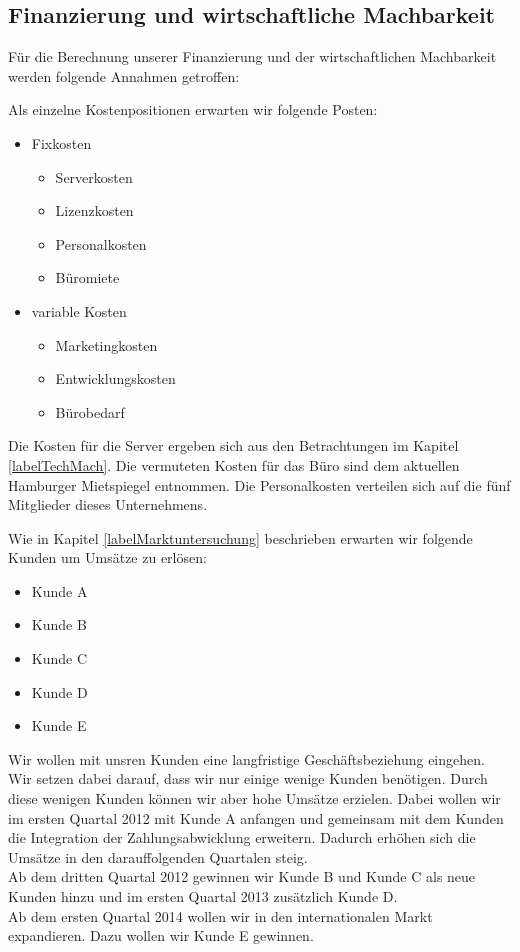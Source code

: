 \newpage
\subsection{Finanzierung und wirtschaftliche Machbarkeit}\label{labelWirtMach}

Für die Berechnung unserer Finanzierung und der wirtschaftlichen Machbarkeit werden folgende Annahmen getroffen:

Als einzelne Kostenpositionen erwarten wir folgende Posten:
\begin{itemize}
\item Fixkosten
 \begin{itemize}
\item Serverkosten
\item Lizenzkosten
\item Personalkosten
\item Büromiete
 \end{itemize}
\item variable Kosten
\begin{itemize}
\item Marketingkosten
\item Entwicklungskosten
\item Bürobedarf
\end{itemize}
\end{itemize}

Die Kosten für die Server ergeben sich aus den Betrachtungen im Kapitel \ref{labelTechMach}. Die vermuteten Kosten für das Büro sind dem aktuellen Hamburger Mietspiegel entnommen. Die Personalkosten verteilen sich auf die fünf Mitglieder dieses Unternehmens.

Wie in Kapitel \ref{labelMarktuntersuchung} beschrieben erwarten wir folgende Kunden um Umsätze zu erlösen:
\begin{itemize}
\item Kunde A
\item Kunde B
\item Kunde C
\item Kunde D
\item Kunde E
\end{itemize}

Wir wollen mit unsren Kunden eine langfristige Geschäftsbeziehung eingehen. Wir setzen dabei darauf, dass wir nur einige wenige Kunden benötigen. Durch diese wenigen Kunden können wir aber hohe Umsätze erzielen.
Dabei wollen wir im ersten Quartal 2012 mit Kunde A anfangen und gemeinsam mit dem Kunden die Integration der Zahlungsabwicklung erweitern. Dadurch erhöhen sich die Umsätze in den darauffolgenden Quartalen steig.\\
Ab dem dritten Quartal 2012 gewinnen wir Kunde B und Kunde C als neue Kunden hinzu und im ersten Quartal 2013 zusätzlich Kunde D.\\
Ab dem ersten Quartal 2014 wollen wir in den internationalen Markt expandieren. Dazu wollen wir Kunde E gewinnen.

